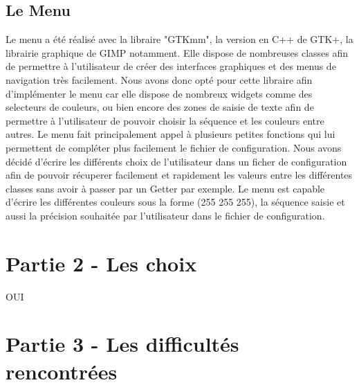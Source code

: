 \documentclass{article}
\begin{document}
    \subsection*{Le Menu}
    Le menu a été réalisé avec la libraire "GTKmm", la version en C++ de GTK+, la librairie graphique de GIMP notamment.
    Elle dispose de nombreuses classes afin de permettre à l'utilisateur de créer des interfaces graphiques et des menus de navigation très facilement.
    Nous avons donc opté pour cette libraire afin d'implémenter le menu car elle dispose de nombreux widgets comme des selecteurs de couleurs, ou bien encore des zones de saisie de texte afin de permettre à l'utilisateur de pouvoir choisir la séquence et les couleurs entre autres.
    Le menu fait principalement appel à plusieurs petites fonctions qui lui permettent de compléter plus facilement le fichier de configuration.
    Nous avons décidé d'écrire les différents choix de l'utilisateur dans un ficher de configuration afin de pouvoir récuperer facilement et rapidement les valeurs entre les différentes classes sans avoir à passer par un Getter par exemple.
    Le menu est capable d'écrire les différentes couleurs sous la forme (255 255 255), la séquence saisie et aussi la précision souhaitée par l'utilisateur dans le fichier de configuration.

\section* {Partie 2 - Les choix}
OUI

\section* {Partie 3 - Les difficultés rencontrées}
\end{document}
